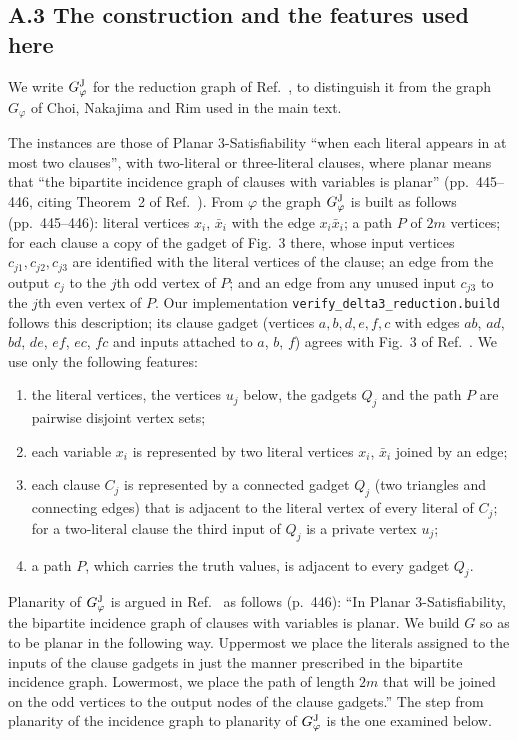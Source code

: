 \documentclass[aps,pre,onecolumn,nofootinbib]{revtex4-2}
\theoremstyle{remark}
\begin{document}
\subsection*{A.3 The construction and the features used here}
We write $G^{\rm J}_\varphi$ for the reduction graph of Ref.~\cite{Johnson2025}, to distinguish it
from the graph $G_\varphi$ of Choi, Nakajima and Rim used in the main text.

The instances are those of Planar 3-Satisfiability ``when each literal appears in at most two
clauses'', with two-literal or three-literal clauses, where planar means that ``the bipartite
incidence graph of clauses with variables is planar'' (pp.~445--446, citing Theorem~2 of
Ref.~\cite{DarmannDockerDorn2018}). From $\varphi$ the graph $G^{\rm J}_\varphi$ is built as follows
(pp.~445--446): literal vertices $x_i$, $\bar x_i$ with the edge $x_i\bar x_i$; a path $P$ of $2m$
vertices; for each clause a copy of the gadget of Fig.~3 there, whose input vertices
$c_{j1},c_{j2},c_{j3}$ are identified with the literal vertices of the clause; an edge from the
output $c_j$ to the $j$th odd vertex of $P$; and an edge from any unused input $c_{j3}$ to the
$j$th even vertex of $P$. Our implementation \texttt{verify\_delta3\_reduction.build} follows this
description; its clause gadget (vertices $a,b,d,e,f,c$ with edges $ab$, $ad$, $bd$, $de$, $ef$, $ec$,
$fc$ and inputs attached to $a$, $b$, $f$) agrees with Fig.~3 of Ref.~\cite{Johnson2025}. We use
only the following features:
\begin{enumerate}
\item[(P0)] the literal vertices, the vertices $u_j$ below, the gadgets $Q_j$ and the path $P$ are
pairwise disjoint vertex sets;
\item[(P1)] each variable $x_i$ is represented by two literal vertices $x_i$, $\bar x_i$ joined by
an edge;
\item[(P2)] each clause $C_j$ is represented by a connected gadget $Q_j$ (two triangles and
connecting edges) that is adjacent to the literal vertex of every literal of $C_j$; for a
two-literal clause the third input of $Q_j$ is a private vertex $u_j$;
\item[(P3)] a path $P$, which carries the truth values, is adjacent to every gadget $Q_j$.
\end{enumerate}
Planarity of $G^{\rm J}_\varphi$ is argued in Ref.~\cite{Johnson2025} as follows (p.~446): ``In Planar
3-Satisfiability, the bipartite incidence graph of clauses with variables is planar. We build $G$
so as to be planar in the following way. Uppermost we place the literals assigned to the inputs
of the clause gadgets in just the manner prescribed in the bipartite incidence graph. Lowermost,
we place the path of length $2m$ that will be joined on the odd vertices to the output nodes of the
clause gadgets.'' The step from planarity of the incidence graph to planarity of $G^{\rm J}_\varphi$ is the
one examined below.
\end{document}
